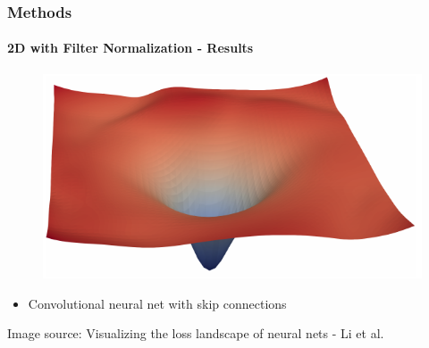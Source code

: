 \documentclass[9pt]{beamer}
\begin{document}
\begin{frame}
\frametitle{Methods}
\framesubtitle{2D with Filter Normalization - Results}
\begin{figure}
	\includegraphics[width=\linewidth]{figures/resnet_loss.png}
\end{figure}
\begin{itemize}
	\item Convolutional neural net with skip connections
\end{itemize}
\tiny\color{lightgray}Image source: Visualizing the loss landscape of neural nets - Li et al.
\end{frame}
\end{document}
